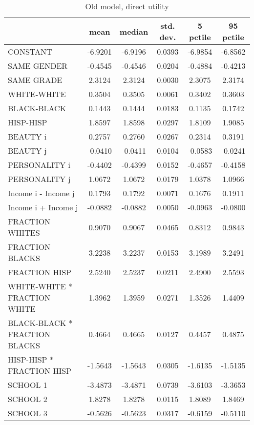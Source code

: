 \documentclass[12pt,letterpaper]{article}
\begin{document}
\begin{small}
\begin{table}[ht]
\caption{Old model, direct utility}
\centering
\begin{tabular}{l|ccccc}
  \hline
 & mean & median & std. dev. & 5 pctile & 95 pctile \\ 
  \hline
CONSTANT & -6.9201 & -6.9196 & 0.0393 & -6.9854 & -6.8562 \\ 
  SAME GENDER & -0.4545 & -0.4546 & 0.0204 & -0.4884 & -0.4213 \\ 
  SAME GRADE & 2.3124 & 2.3124 & 0.0030 & 2.3075 & 2.3174 \\ 
  WHITE-WHITE & 0.3504 & 0.3505 & 0.0061 & 0.3402 & 0.3603 \\ 
  BLACK-BLACK & 0.1443 & 0.1444 & 0.0183 & 0.1135 & 0.1742 \\ 
  HISP-HISP & 1.8597 & 1.8598 & 0.0297 & 1.8109 & 1.9085 \\ 
  BEAUTY i & 0.2757 & 0.2760 & 0.0267 & 0.2314 & 0.3191 \\ 
  BEAUTY j & -0.0410 & -0.0411 & 0.0104 & -0.0583 & -0.0241 \\ 
  PERSONALITY i & -0.4402 & -0.4399 & 0.0152 & -0.4657 & -0.4158 \\ 
  PERSONALITY j & 1.0672 & 1.0672 & 0.0179 & 1.0378 & 1.0966 \\ 
  Income i - Income j & 0.1793 & 0.1792 & 0.0071 & 0.1676 & 0.1911 \\ 
  Income i + Income j & -0.0882 & -0.0882 & 0.0050 & -0.0963 & -0.0800 \\ 
  FRACTION WHITES & 0.9070 & 0.9067 & 0.0465 & 0.8312 & 0.9843 \\ 
  FRACTION BLACKS & 3.2238 & 3.2237 & 0.0153 & 3.1989 & 3.2491 \\ 
  FRACTION HISP & 2.5240 & 2.5237 & 0.0211 & 2.4900 & 2.5593 \\ 
  WHITE-WHITE * FRACTION WHITE & 1.3962 & 1.3959 & 0.0271 & 1.3526 & 1.4409 \\ 
  BLACK-BLACK * FRACTION BLACKS & 0.4664 & 0.4665 & 0.0127 & 0.4457 & 0.4875 \\ 
  HISP-HISP * FRACTION HISP & -1.5643 & -1.5643 & 0.0305 & -1.6135 & -1.5135 \\ 
  SCHOOL 1 & -3.4873 & -3.4871 & 0.0739 & -3.6103 & -3.3653 \\ 
  SCHOOL 2 & 1.8278 & 1.8278 & 0.0115 & 1.8089 & 1.8469 \\ 
  SCHOOL 3 & -0.5626 & -0.5623 & 0.0317 & -0.6159 & -0.5110 \\ 

\end{tabular}
\end{table}
\end{small}
\end{document}
